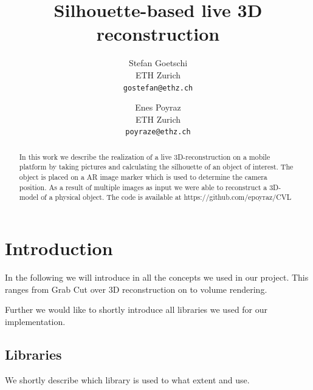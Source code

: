 \documentclass[10pt,twocolumn,letterpaper]{article}
\begin{document}
\title{Silhouette-based live 3D reconstruction}

\author{Stefan Goetschi\\
ETH Zurich\\
{\tt\small gostefan@ethz.ch}
\and
Enes Poyraz\\
ETH Zurich\\
{\tt\small poyraze@ethz.ch}
}

\maketitle

\begin{abstract}
In this work we describe the realization of a live 3D-reconstruction on a mobile platform by taking pictures and calculating the silhouette of an object of interest. The object is placed on a AR image marker which is used to determine the camera position. As a result of multiple images as input we were able to reconstruct a 3D-model of a physical object. The code is available at https://github.com/epoyraz/CVL

\end{abstract}

\section{Introduction}

In the following we will introduce in all the concepts we used in our project. This ranges from Grab Cut over 3D reconstruction on to volume rendering.

Further we would like to shortly introduce all libraries we used for our implementation.

\subsection{Libraries}

We shortly describe which library is used to what extent and use.
\end{document}
